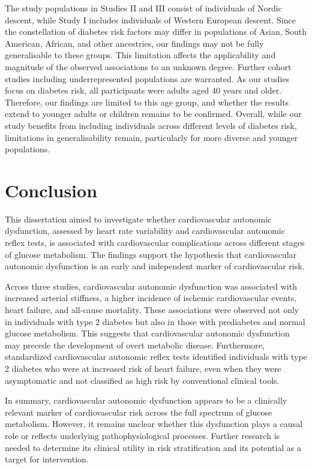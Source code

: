 \documentclass[
  a4paper,
  headsepline=true,
  open=any]{scrbook}
\begin{document}
The study populations in Studies II and III consist of individuals of
Nordic descent, while Study I includes individuals of Western European
descent. Since the constellation of diabetes risk factors may differ in
populations of Asian, South American, African, and other ancestries, our
findings may not be fully generalisable to these groups. This limitation
affects the applicability and magnitude of the observed associations to
an unknown degree. Further cohort studies including underrepresented
populations are warranted. As our studies focus on diabetes risk, all
participants were adults aged 40 years and older. Therefore, our
findings are limited to this age group, and whether the results extend
to younger adults or children remains to be confirmed. Overall, while
our study benefits from including individuals across different levels of
diabetes risk, limitations in generalisability remain, particularly for
more diverse and younger populations.


\hypertarget{conclusion}{%
\chapter{Conclusion}\label{conclusion}}

This dissertation aimed to investigate whether cardiovascular autonomic
dysfunction, assessed by heart rate variability and cardiovascular
autonomic reflex tests, is associated with cardiovascular complications
across different stages of glucose metabolism. The findings support the
hypothesis that cardiovascular autonomic dysfunction is an early and
independent marker of cardiovascular risk.

Across three studies, cardiovascular autonomic dysfunction was
associated with increased arterial stiffness, a higher incidence of
ischemic cardiovascular events, heart failure, and all-cause mortality.
These associations were observed not only in individuals with type 2
diabetes but also in those with prediabetes and normal glucose
metabolism. This suggests that cardiovascular autonomic dysfunction may
precede the development of overt metabolic disease. Furthermore,
standardized cardiovascular autonomic reflex tests identified
individuals with type 2 diabetes who were at increased risk of heart
failure, even when they were asymptomatic and not classified as high
risk by conventional clinical tools.

In summary, cardiovascular autonomic dysfunction appears to be a
clinically relevant marker of cardiovascular risk across the full
spectrum of glucose metabolism. However, it remains unclear whether this
dysfunction plays a causal role or reflects underlying
pathophysiological processes. Further research is needed to determine
its clinical utility in risk stratification and its potential as a
target for intervention.
\end{document}
